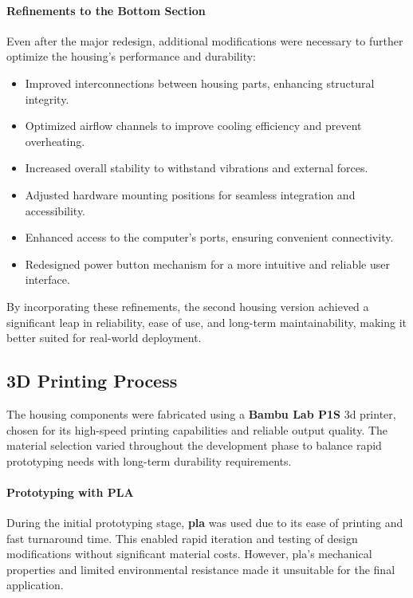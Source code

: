 
\paragraph{Refinements to the Bottom Section}  
Even after the major redesign, additional modifications were necessary to further optimize the housing’s performance and durability:  
\begin{itemize}  
	\item Improved interconnections between housing parts, enhancing structural integrity.  
	\item Optimized airflow channels to improve cooling efficiency and prevent overheating.  
	\item Increased overall stability to withstand vibrations and external forces.  
	\item Adjusted hardware mounting positions for seamless integration and accessibility.  
	\item Enhanced access to the computer’s ports, ensuring convenient connectivity.  
	\item Redesigned power button mechanism for a more intuitive and reliable user interface.  
\end{itemize}  

By incorporating these refinements, the second housing version achieved a significant leap in reliability, ease of use, and long-term maintainability, making it better suited for real-world deployment.  


\subsection{3D Printing Process}  

The housing components were fabricated using a \textbf{Bambu Lab P1S} \acrshort{3d} printer, chosen for its high-speed printing capabilities and reliable output quality. The material selection varied throughout the development phase to balance rapid prototyping needs with long-term durability requirements.  

\paragraph{Prototyping with PLA}  
During the initial prototyping stage, \textbf{\acrfull{pla}} was used due to its ease of printing and fast turnaround time. This enabled rapid iteration and testing of design modifications without significant material costs. However, \acrshort{pla}'s mechanical properties and limited environmental resistance made it unsuitable for the final application.  

